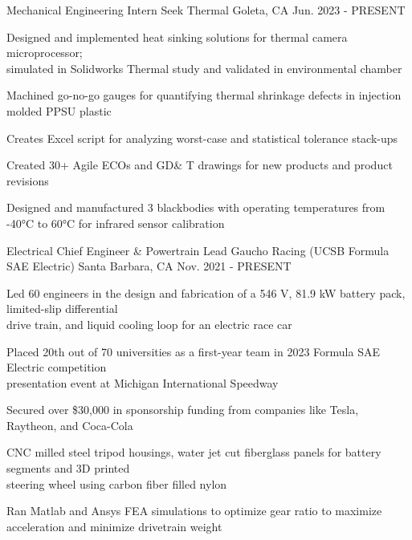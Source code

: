 

\begin{cventries}

\cventry
{Mechanical Engineering Intern} %
{Seek Thermal} %
{Goleta, CA} %
{Jun. 2023 - PRESENT} %
{ %
\begin{cvitems}
\item{Designed and implemented heat sinking solutions for thermal camera microprocessor; \\ simulated in Solidworks Thermal study and validated in environmental chamber}
\item{Machined go-no-go gauges for quantifying thermal shrinkage defects in injection molded PPSU plastic}
\item{Creates Excel script for analyzing worst-case and statistical tolerance stack-ups}
\item{Created 30+ Agile ECOs and GD\& T drawings for new products and product revisions}
\item{Designed and manufactured 3 blackbodies with operating temperatures from -40°C to 60°C for infrared sensor calibration}
\end{cvitems}
}

\cventry
{Electrical Chief Engineer \& Powertrain Lead} %
{Gaucho Racing (UCSB Formula SAE Electric)} %
{Santa Barbara, CA} %
{Nov. 2021 - PRESENT} %
{ %
\begin{cvitems}   
\item {Led 60 engineers in the design and fabrication of a 546 V, 81.9 kW battery pack, limited-slip differential \\ drive train, and liquid cooling loop for an electric race car}
\item {Placed 20th out of 70 universities as a first-year team in 2023 Formula SAE Electric competition\\ presentation event at Michigan International Speedway}
\item {Secured over \$30,000 in sponsorship funding from companies like Tesla, Raytheon, and Coca-Cola}
\item {CNC milled steel tripod housings, water jet cut fiberglass panels for battery segments and 3D printed \\ steering wheel using carbon fiber filled nylon}
\item {Ran Matlab and Ansys FEA simulations to optimize gear ratio to maximize acceleration and minimize drivetrain weight}
\end{cvitems}
}



\end{cventries}
